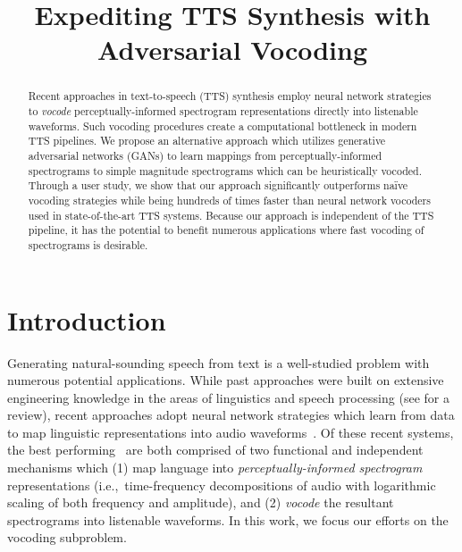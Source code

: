 \documentclass[a4paper]{article}
\title{Expediting TTS Synthesis with Adversarial Vocoding}
\begin{document}
\maketitle
% 
\begin{abstract}
Recent approaches in text-to-speech (TTS) synthesis employ neural network strategies to \emph{vocode} perceptually-informed spectrogram representations directly into listenable waveforms. 
Such vocoding procedures create a computational bottleneck in modern TTS pipelines. 
We propose an alternative approach which utilizes generative adversarial networks (GANs) to learn mappings from perceptually-informed spectrograms to simple magnitude spectrograms which can be heuristically vocoded. 
Through a user study, we show that our approach significantly outperforms na\"ive vocoding strategies while being hundreds of times faster than neural network vocoders used in state-of-the-art TTS systems. 
Because our approach is independent of the TTS pipeline, it has the potential to benefit numerous applications where fast vocoding of spectrograms is desirable. 
\end{abstract}


\section{Introduction}

Generating natural-sounding speech from text is a well-studied problem with numerous potential applications. 
While past approaches were built on extensive engineering knowledge in the areas of linguistics and speech processing  (see %
\cite{todo} for a review), 
recent approaches adopt neural network strategies which learn from data to map linguistic representations into audio waveforms~\cite{arik2017deep,gibiansky2017deep,ping2017deep,wang2017tacotron,shen2018natural}. 
Of these recent systems, 
the best performing~\cite{ping2017deep,shen2018natural} are both comprised of two functional and independent mechanisms which 
(1) map language into \emph{perceptually-informed spectrogram} representations (i.e.,~time-frequency decompositions of audio with logarithmic scaling of both frequency and amplitude), and 
(2) \emph{vocode} the resultant spectrograms into listenable waveforms. 
In this work, we focus our efforts on the vocoding subproblem.
\end{document}
